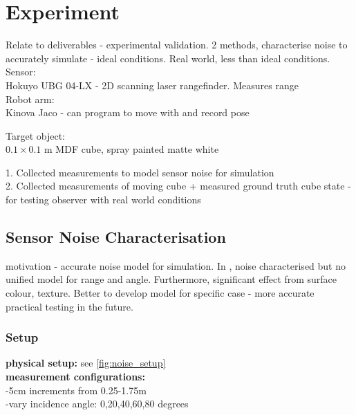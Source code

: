 \chapter{Experiment}
Relate to deliverables - experimental validation.
2 methods, characterise noise to accurately simulate - ideal conditions.
Real world, less than ideal conditions.
Sensor:\\
Hokuyo UBG 04-LX - 2D scanning laser rangefinder. Measures range\\

Robot arm: \\
Kinova Jaco - can program to move with and record pose

Target object: \\
$0.1 \times 0.1$ m MDF cube, spray painted matte white

1. Collected measurements to model sensor noise for simulation\\
2. Collected measurements of moving cube + measured ground truth cube state - for testing observer with real world conditions

\section{Sensor Noise Characterisation} \label{sensor_noise}
motivation - accurate noise model for simulation. In \cite{park2010characterization}, noise characterised but no unified model for range and angle. Furthermore, significant effect from surface colour, texture. Better to develop model for specific case - more accurate practical testing in the future.

	\subsection{Setup}
		\textbf{physical setup:} see \ref{fig:noise_setup}\\
		\textbf{measurement configurations:}\\
			-5cm increments from 0.25-1.75m\\
			-vary incidence angle: 0,20,40,60,80 degrees
		 
